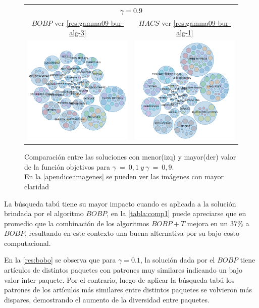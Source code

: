\begin{figure}[H]
\begin{tabular}{cc}
		\multicolumn{2}{c}{$\gamma=0.9$}\vspace{0.5cm}\\
		$BOBP$ ver \autoref{res:gamma09-bur-alg-3} & $HACS$ ver \autoref{res:gamma09-bur-alg-1} \\
		\includegraphics[width=0.45\linewidth]{img/gamma-09-burbujas-alg-3.png}&
		\includegraphics[width=0.45\linewidth]{img/gamma-09-burbujas-alg-1.png}\\
	\end{tabular}
	\caption{Comparación entre las soluciones con menor(izq) y mayor(der) valor de la función objetivos  para $\gamma\ =\ 0,1\ y\ \gamma\ =\ 0,9$.\\En la \autoref{apendice:imagenes} se pueden ver las imágenes con mayor claridad}
	\label{res:comp1}
\end{figure}

La búsqueda tabú tiene su mayor impacto cuando es aplicada a la solución brindada por el algoritmo $BOBP$, en la \autoref{tabla:comp1} puede apreciarse que en promedio que la combinación de los algoritmos $BOBP+T$ mejora en un $37\%$ a $BOBP$, resultando en este contexto una buena alternativa por su bajo costo computacional.

En la \autoref{res:bobo} se observa que para $\gamma=0.1$, la solución dada por el $BOBP$ tiene artículos de distintos paquetes con patrones muy similares indicando un bajo valor inter-paquete. Por el contrario, luego de aplicar la búsqueda tabú los patrones de los artículos más similares entre distintos paquetes se volvieron más dispares, demostrando el aumento de la diversidad entre paquetes. 

